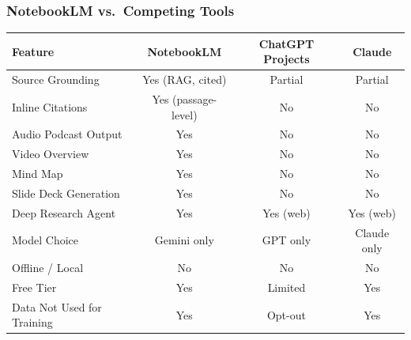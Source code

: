 \begin{frame}[fragile]\frametitle{NotebookLM vs.\ Competing Tools}
  \begin{center}
  \begin{tabular}{|l|c|c|c|}
    \hline
    \textbf{Feature} & \textbf{NotebookLM} & \textbf{ChatGPT Projects} & \textbf{Claude} \\
    \hline
    Source Grounding & Yes (RAG, cited) & Partial & Partial \\
    Inline Citations & Yes (passage-level) & No & No \\
    Audio Podcast Output & Yes & No & No \\
    Video Overview & Yes & No & No \\
    Mind Map & Yes & No & No \\
    Slide Deck Generation & Yes & No & No \\
    Deep Research Agent & Yes & Yes (web) & Yes (web) \\
    Model Choice & Gemini only & GPT only & Claude only \\
    Offline / Local & No & No & No \\
    Free Tier & Yes & Limited & Yes \\
    Data Not Used for Training & Yes & Opt-out & Yes \\
    \hline
  \end{tabular}
  \end{center}
\end{frame}

